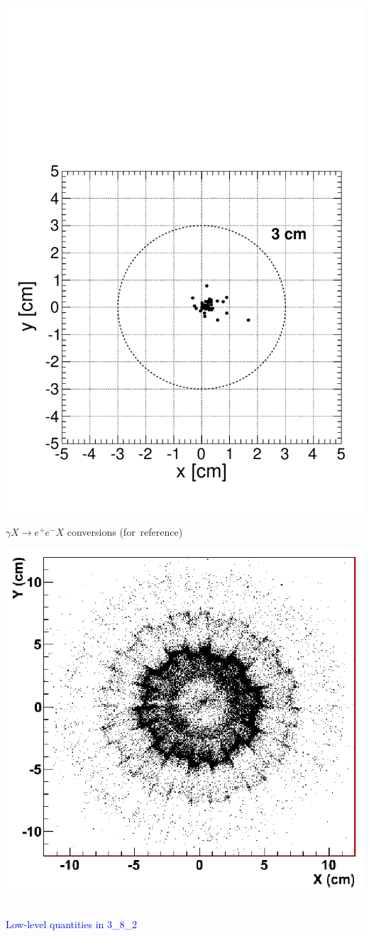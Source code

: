 \documentclass[compress]{beamer}
\begin{document}
\begin{frame}
\begin{columns}
\begin{center}
\includegraphics[width=0.7\linewidth]{Mu9_massbelow300MeV_vx_vy.pdf}

{\scriptsize $\gamma X \to e^+e^- X$ conversions (for~reference)}

\includegraphics[width=0.7\linewidth]{electron_conversions.png}
\end{center}
\end{columns}
\end{frame}

\begin{frame}
\begin{center}
\Huge \textcolor{blue}{Low-level quantities in 3\_8\_2}
\end{center}
\end{frame}
\end{document}
